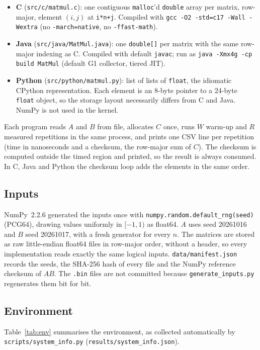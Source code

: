 \documentclass[11pt,a4paper]{article}
\begin{document}
\begin{itemize}
  \item \textbf{C} (\texttt{src/c/matmul.c}): one contiguous \texttt{malloc}'d \texttt{double}
        array per matrix, row-major, element $(i,j)$ at \texttt{i*n+j}. Compiled with
        \texttt{gcc -O2 -std=c17 -Wall -Wextra} (no \texttt{-march=native}, no \texttt{-ffast-math}).
  \item \textbf{Java} (\texttt{src/java/MatMul.java}): one \texttt{double[]} per matrix with the same
        row-major indexing as C. Compiled with default \texttt{javac}; run as
        \texttt{java -Xmx4g -cp build MatMul} (default G1 collector, tiered JIT).
  \item \textbf{Python} (\texttt{src/python/matmul.py}): list of lists of \texttt{float}, the
        idiomatic CPython representation. Each element is an 8-byte pointer to a 24-byte
        \texttt{float} object, so the storage layout necessarily differs from C and Java. NumPy is not
        used in the kernel.
\end{itemize}

Each program reads $A$ and $B$ from file, allocates $C$ once, runs $W$ warm-up and $R$ measured
repetitions in the same process, and prints one CSV line per repetition (time in nanoseconds and
a checksum, the row-major sum of $C$). The checksum is computed outside the timed region and
printed, so the result is always consumed. In C, Java and Python the checksum loop adds the
elements in the same order.

\subsection{Inputs}
NumPy~2.2.6 generated the inputs once with \texttt{numpy.random.default\_rng(seed)} (PCG64), drawing
values uniformly in $[-1, 1)$ as float64. $A$ uses seed 20261016 and $B$ seed 20261017,
with a fresh generator for every $n$. The matrices are stored as raw little-endian float64 files in
row-major order, without a header, so every implementation reads exactly the same logical
inputs. \texttt{data/manifest.json} records the seeds, the SHA-256 hash of every file and the NumPy reference
checksum of $AB$. The \texttt{.bin} files are not committed because
\texttt{generate\_inputs.py} regenerates them bit for bit.

\subsection{Environment}
Table~\ref{tab:env} summarises the environment, as collected automatically by
\texttt{scripts/system\_info.py} (\texttt{results/system\_info.json}).
\end{document}
